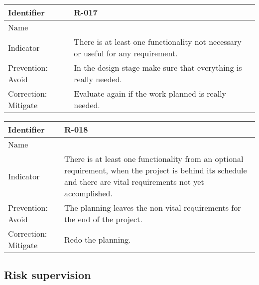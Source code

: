 \begin{table}[H]
	\begin{tabularx}{\textwidth}{|y|z|}
		\hline
		Identifier & \textbf{R-017} \\ \hline
		Name & \Rdiecisiete \\ \hline
		Indicator & There is at least one functionality not necessary or useful for any requirement.\\ \hline
		Prevention: Avoid
			& In the design stage make sure that everything is really needed.\\ \hline
		Correction: Mitigate
			& Evaluate again if the work planned is really needed.\\ \hline
	\end{tabularx}
\end{table}

\begin{table}[H]
	\begin{tabularx}{\textwidth}{|y|z|}
		\hline
		Identifier & \textbf{R-018} \\ \hline
		Name & \Rdieciocho \\ \hline
		Indicator & There is at least one functionality from an optional requirement, when the project is behind its schedule and there are vital requirements not yet accomplished.\\ \hline
		Prevention: Avoid
			& The planning leaves the non-vital requirements for the end of the project.\\ \hline
		Correction: Mitigate
			& Redo the planning.\\ \hline
	\end{tabularx}
\end{table}



\subsection{Risk supervision}


